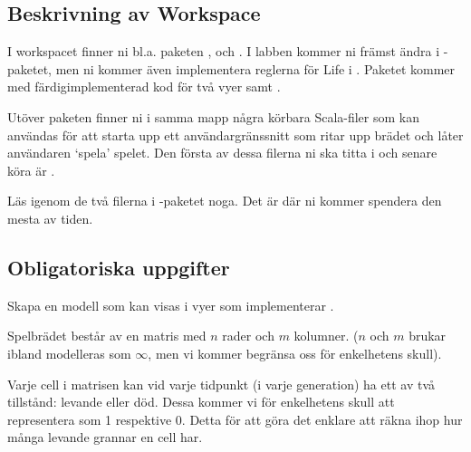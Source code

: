 \subsection{Beskrivning av Workspace}

I workspacet finner ni bl.a. paketen ,  och . I labben kommer ni främst ändra i -paketet, men ni kommer även implementera reglerna för Life i . Paketet  kommer med färdigimplementerad kod för två vyer  samt .

Utöver paketen finner ni i samma mapp några körbara Scala-filer som kan användas för att starta upp ett användargränssnitt som ritar upp brädet och låter användaren `spela' spelet. Den första av dessa filerna ni ska titta i och senare köra är .

Läs igenom de två filerna i -paketet noga. Det är där ni kommer spendera den mesta av tiden.


\subsection{Obligatoriska uppgifter}


\Task Skapa en modell som kan visas i vyer som implementerar .

Spelbrädet består av en matris med $n$ rader och $m$ kolumner. ($n$ och $m$ brukar ibland modelleras som $\infty$, men vi kommer begränsa oss för enkelhetens skull).

Varje cell i matrisen kan vid varje tidpunkt (i varje generation) ha ett av två tillstånd: levande eller död. Dessa kommer vi för enkelhetens skull att representera som 1 respektive 0. Detta för att göra det enklare att räkna ihop hur många levande grannar en cell har.


